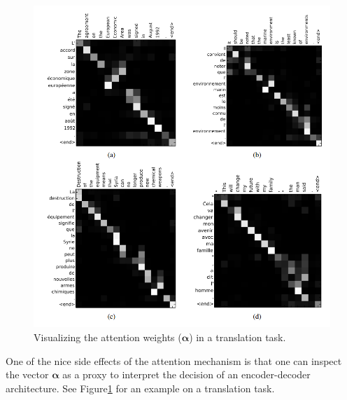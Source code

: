 \documentclass[paper=a4, fontsize=11pt,twoside, abstracton]{scrartcl}
\begin{document}
\begin{figure}
  \includegraphics[width=\linewidth]{attention_vis.png}
  \caption{Visualizing the attention weights ($\boldsymbol{\alpha}$) in a translation task.}\label{fig:attention_translation}
\end{figure}

One of the nice side effects of the attention mechanism is that one can inspect  the vector $\boldsymbol{\alpha}$ as a proxy to interpret the decision of an encoder-decoder architecture. See Figure\ref{fig:attention_translation} for an example on a translation task.


\nocite{*}
{}
\end{document}
